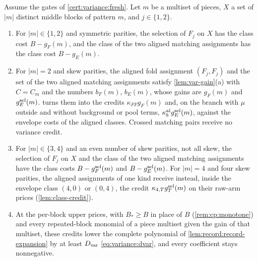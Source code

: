 \begin{corollary}
\label{cor:variance:final}
Assume the gates of \cref{cert:variance:fresh}. Let $m$ be a multiset of pieces,
$X$ a set of $|m|$ distinct middle blocks of pattern $m$, and $j\in\{1,2\}$.
\begin{enumerate}[label=(\roman*)]
\item For $|m|\in\{1,2\}$ and symmetric parities, the selection of $F_j$ on $X$ has
 the class cost $B-g_F(m)$, and the class of the two aligned matching
 assignments has the class cost $B-g_E(m)$.
\item For $|m|=2$ and skew parities, the aligned fold assignment $(F_j,F_j)$ and
 the set of the two aligned matching assignments satisfy \cref{lem:var-gain}(a)
 with $C=C_m$ and the numbers $b_F(m)$, $b_E(m)$, whose gains are $g_F(m)$ and
 $g^{\rm sel}_E(m)$.  turns them into the credits
 $\kappa_{FF}g_F(m)$ and, on the branch with $\mu$ outside and without background
 or pool terms, $\kappa^{\rm al}_bg^{\rm sel}_E(m)$, against the envelope costs of
 the aligned classes. Crossed matching pairs receive no variance credit.
\item For $|m|\in\{3,4\}$ and an even number of skew parities, not all skew, the
 selection of $F_j$ on $X$ and the class of the two aligned matching assignments
 have the class costs $B-g^{\rm sel}_F(m)$ and $B-g^{\rm sel}_E(m)$. For $|m|=4$
 and four skew parities, the aligned assignments of one kind receive instead,
 inside the envelope class $(4,0)$ or $(0,4)$, the credit
 $\kappa_{4,T}g^{\rm sel}_T(m)$ on their raw-arm prices (\cref{lem:class-credit}).
\item At the per-block upper prices, with $B_*\ge B$ in place of $B$
 (\cref{rem:cp:monotone}) and every repeated-block monomial of a piece multiset
 given the gain of that multiset, these credits lower the complete polynomial of
 \cref{lem:record:record-expansion} by at least $D_{\rm var}$
 \eqref{eq:variance:dvar}, and every coefficient stays nonnegative.
\end{enumerate}
\end{corollary}

